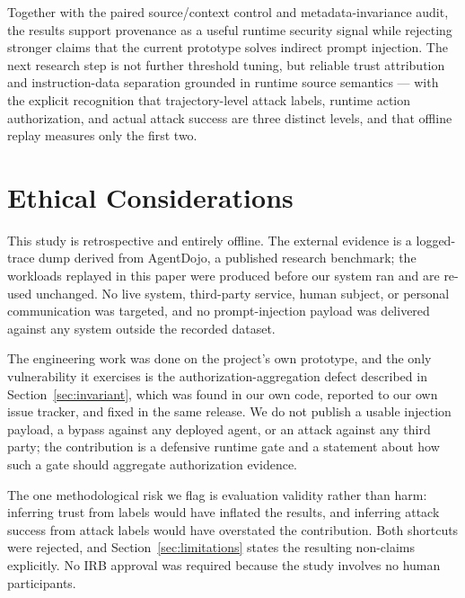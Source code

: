 \documentclass[letterpaper,twocolumn,10pt]{article}
\begin{document}
Together with the paired source/context control and metadata-invariance audit,
the results support provenance as a useful runtime security signal while
rejecting stronger claims that the current prototype solves indirect prompt
injection. The next research step is not further threshold tuning, but reliable
trust attribution and instruction-data separation grounded in runtime source
semantics --- with the explicit recognition that trajectory-level attack labels,
runtime action authorization, and actual attack success are three distinct
levels, and that offline replay measures only the first two.

\cleardoublepage
\appendix
\section*{Ethical Considerations}

This study is retrospective and entirely offline. The external evidence is a
logged-trace dump derived from AgentDojo, a published research benchmark; the
workloads replayed in this paper were produced before our system ran and are
re-used unchanged. No live system, third-party service, human subject, or
personal communication was targeted, and no prompt-injection payload was
delivered against any system outside the recorded dataset.

The engineering work was done on the project's own prototype, and the only
vulnerability it exercises is the authorization-aggregation defect described in
Section~\ref{sec:invariant}, which was found in our own code, reported to our own
issue tracker, and fixed in the same release. We do not publish a usable
injection payload, a bypass against any deployed agent, or an attack against any
third party; the contribution is a defensive runtime gate and a statement about
how such a gate should aggregate authorization evidence.

The one methodological risk we flag is evaluation validity rather than harm:
inferring trust from labels would have inflated the results, and inferring attack
success from attack labels would have overstated the contribution. Both
shortcuts were rejected, and Section~\ref{sec:limitations} states the resulting
non-claims explicitly. No IRB approval was required because the study involves
no human participants.
\end{document}
